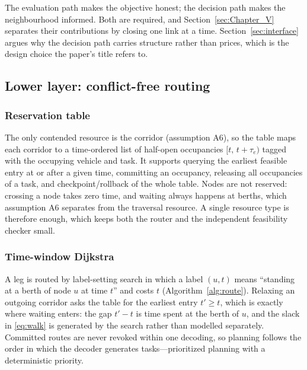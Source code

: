 \documentclass[manuscript,screen,review]{acmart}
\begin{document}
The evaluation path makes the objective honest; the decision path makes the
neighbourhood informed. Both are required, and
Section~\ref{sec:Chapter_V} separates their contributions by closing one link
at a time. Section~\ref{sec:interface} argues why the decision path carries
structure rather than prices, which is the design choice the paper's title
refers to.


\subsection{Lower layer: conflict-free routing}
\label{sec:router}

\subsubsection{Reservation table}
The only contended resource is the corridor (assumption A6), so the table maps
each corridor to a time-ordered list of half-open occupancies
$[t,\,t+\tau_e)$ tagged with the occupying vehicle and task. It supports
querying the earliest feasible entry at or after a given time, committing an
occupancy, releasing all occupancies of a task, and checkpoint/rollback of the
whole table. Nodes are not reserved: crossing a node takes zero time, and
waiting always happens at berths, which assumption A6 separates from the
traversal resource. A single resource type is therefore enough, which keeps
both the router and the independent feasibility checker small.

\subsubsection{Time-window Dijkstra}
A leg is routed by label-setting search in which a label $(u,t)$ means
``standing at a berth of node $u$ at time $t$'' and costs $t$
(Algorithm~\ref{alg:route}). Relaxing an outgoing corridor asks the table for
the earliest entry $t'\ge t$, which is exactly where waiting enters: the gap
$t'-t$ is time spent at the berth of $u$, and the slack in \eqref{eq:walk} is
generated by the search rather than modelled separately. Committed routes are
never revoked within one decoding, so planning follows the order in which the
decoder generates tasks---prioritized planning with a deterministic priority.
\end{document}

